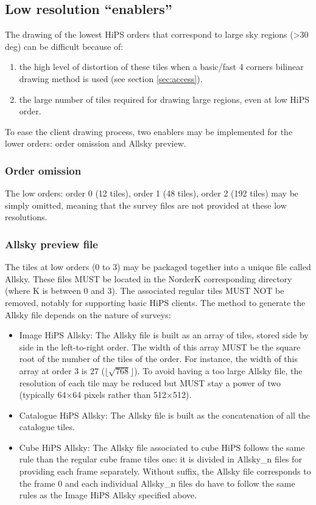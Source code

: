 \documentclass[11pt,a4paper]{ivoa}
\begin{document}
\subsection{Low resolution ``enablers''}

The drawing of the lowest HiPS orders that correspond to large sky regions (>30 deg) can be difficult because of:
\begin{enumerate}
\item the high level of distortion of these tiles when a basic/fast 4 corners bilinear drawing method is used (see section \ref{sec:access}).
\item the large number of tiles required for drawing large regions, even at low HiPS order.
\end{enumerate}

To ease the client drawing process, two enablers may be implemented for the lower orders: order omission and Allsky preview.

\subsubsection{Order omission}

The low orders: order 0 (12 tiles), order 1 (48 tiles), order 2 (192 tiles) may be simply omitted, meaning that the survey files are not provided at these low resolutions.

\subsubsection{Allsky preview file}

The tiles at low orders (0 to 3) may be packaged together into a unique file called Allsky. These files MUST be located in the NorderK corresponding directory (where K is between 0 and 3). The associated regular tiles MUST NOT be removed, notably for supporting basic HiPS clients. The method to generate the Allsky file depends on the nature of surveys: 

\begin{itemize}
\item Image HiPS Allsky: The Allsky file is built as an array of tiles, stored side by side in the left-to-right order. The width of this array MUST be the square root of the number of the tiles of the order. For instance, the width of this array at order 3 is 27 ($\lfloor\sqrt{768}\rfloor$). To avoid having a too large Allsky file, the resolution of each tile may be reduced but MUST stay a power of two (typically 64×64 pixels rather than 512×512).

\item Catalogue HiPS Allsky: The Allsky file is built as the concatenation of all the catalogue tiles. 

\item Cube HiPS Allsky: The Allsky file associated to cube HiPS follows the same rule than the regular cube frame tiles one: it is divided in Allsky\_n files for providing each frame separately. Without suffix, the Allsky file corresponds to the frame 0 and each individual Allsky\_n files do have to follow the same rules as the Image HiPS Allsky specified above.
\end{itemize}
\end{document}
